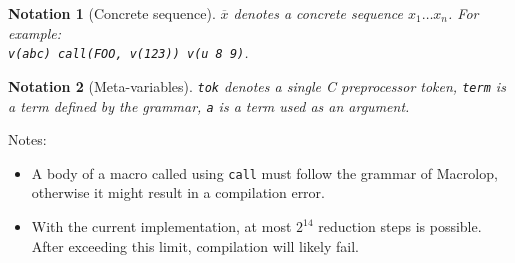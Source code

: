 \documentclass[a4paper, 12pt]{article}
\newtheorem{notation}{Notation}
\begin{document}
\begin{notation}[Concrete sequence]
    $\overline{x}$ denotes a concrete sequence $x_1 \ldots x_n$. For example: \\
    \texttt{v(abc) call(FOO, v(123)) v(u 8 9)}.
\end{notation}

\begin{notation}[Meta-variables]
    \texttt{tok} denotes a single C preprocessor token, \texttt{term} is a term defined
    by the grammar, \texttt{a} is a term used as an argument.
\end{notation}

Notes:

\begin{itemize}
    \item A body of a macro called using \texttt{call} must follow the grammar of
    Macrolop, otherwise it might result in a compilation error.
    \item With the current implementation, at most $2^{14}$ reduction steps is
    possible. After exceeding this limit, compilation will likely fail.
\end{itemize}
\end{document}
